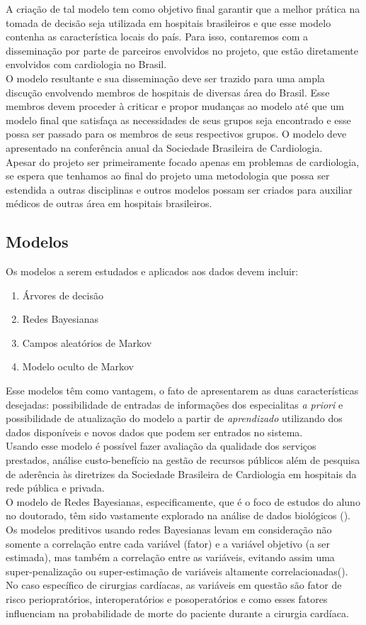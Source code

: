 \documentclass{article}
\begin{document}
A criação de tal modelo tem como objetivo final garantir que a melhor prática na tomada de decisão seja utilizada em 
hospitais brasileiros e que esse modelo contenha as característica locais do país. Para isso, contaremos com a 
disseminação por parte de parceiros envolvidos no projeto, que estão diretamente envolvidos com cardiologia no Brasil.\\
O modelo resultante e sua disseminação deve ser trazido para 
uma ampla discução envolvendo membros de hospitais de diversas área do Brasil. 
Esse membros devem proceder à criticar e propor mudanças ao modelo até que um modelo final que satisfaça as 
necessidades de seus grupos seja encontrado e esse possa ser passado para os membros de seus respectivos grupos. 
O modelo deve apresentado na conferência anual da Sociedade Brasileira de Cardiologia.\\
Apesar do projeto ser primeiramente focado apenas em problemas de cardiologia, se espera que tenhamos ao final do 
projeto uma metodologia que possa ser estendida a outras disciplinas e outros modelos possam ser criados para auxiliar 
médicos de outras área em hospitais brasileiros.
\subsection{ \label{subsec:modelos} Modelos}
Os modelos a serem estudados e aplicados aos dados devem incluir:
\begin{enumerate}
\item Árvores de decisão 
\item Redes Bayesianas 
\item Campos aleatórios de Markov
\item Modelo oculto de Markov
\end{enumerate}
Esse modelos têm como vantagem, o fato de apresentarem as duas características desejadas: possibilidade de entradas de 
informações dos especialitas \textit{a priori} e possibilidade de atualização do modelo a partir de \textit{aprendizado}
utilizando dos dados disponíveis e novos dados que podem ser entrados no sistema.\\
Usando esse modelo é possível fazer avaliação da qualidade dos serviços prestados, análise custo-benefício na gestão 
de recursos públicos além de pesquisa de aderência às diretrizes da Sociedade Brasileira de Cardiologia em hospitais 
da rede pública e privada.\\
O modelo de Redes Bayesianas, especificamente, que é o foco de estudos do aluno no doutorado, têm sido vastamente 
explorado na análise de dados biológicos (\cite{friedman_2000}). Os modelos preditivos usando redes Bayesianas levam 
em consideração não somente a correlação entre cada variável (fator) e a variável objetivo (a ser estimada), 
mas também a correlação entre as variáveis, evitando assim uma super-penalização ou super-estimação de variáveis 
altamente correlacionadas(\cite{friedman_1997}).\\
No caso específico de cirurgias cardíacas, as variáveis em questão são fator de risco periopratórios, interoperatórios 
e posoperatórios e como esses fatores influenciam na probabilidade de morte do paciente durante a cirurgia cardíaca.
\end{document}
